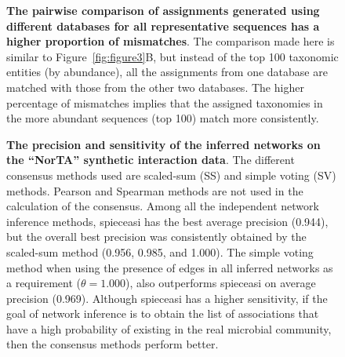 \documentclass[letterpaper,12pt]{article}
\begin{document}
    \begin{figure}[H]
      \centering
        \caption{
          \textbf{The pairwise comparison of assignments generated using different databases for all representative sequences has a higher proportion of mismatches}.
          The comparison made here is similar to Figure~\ref{fig:figure3}B, but instead of the top 100 taxonomic entities (by abundance), all the assignments from one database are matched with those from the other two databases.
          The higher percentage of mismatches implies that the assigned taxonomies in the more abundant sequences (top 100) match more consistently.
        }
      \label{fig:figure_s4}
    \end{figure}

  \begin{figure}[H]
    \centering
      \caption{
        \textbf{The precision and sensitivity of the inferred networks on the ``NorTA'' synthetic interaction data}.
        The different consensus methods used are scaled-sum (SS) and simple voting (SV) methods.
        Pearson and Spearman methods are not used in the calculation of the consensus.
        Among all the independent network inference methods, \acs{spieceasi} has the best average precision (0.944), but the overall best precision was consistently obtained by the scaled-sum method (0.956, 0.985, and 1.000).
        The simple voting method when using the presence of edges in all inferred networks as a requirement ($\theta = 1.000$), also outperforms \acs{spieceasi} on average precision (0.969).
        Although \acs{spieceasi} has a higher sensitivity, if the goal of network inference is to obtain the list of associations that have a high probability of existing in the real microbial community, then the consensus methods perform better.
      }
    \label{fig:figure_s5}
  \end{figure}
\end{document}
